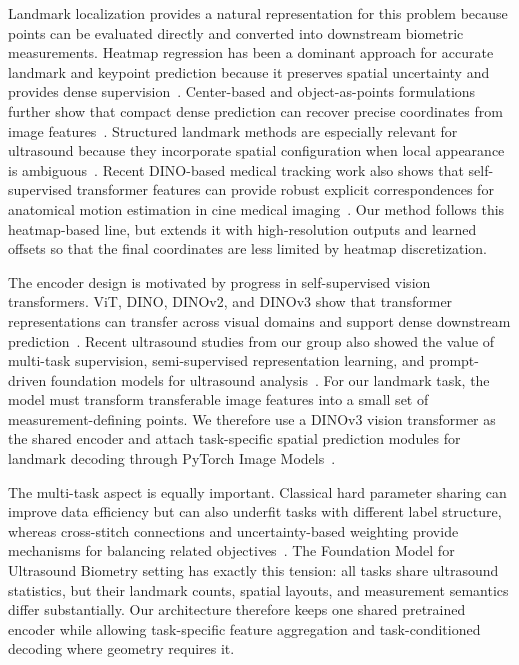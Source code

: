 \documentclass[runningheads]{llncs}
\begin{document}
Landmark localization provides a natural representation for this problem because points can be evaluated directly and converted into downstream biometric measurements. Heatmap regression has been a dominant approach for accurate landmark and keypoint prediction because it preserves spatial uncertainty and provides dense supervision~\cite{payer2016regressing,newell2016hourglass,sun2019hrnet}. Center-based and object-as-points formulations further show that compact dense prediction can recover precise coordinates from image features~\cite{zhou2019objects}. Structured landmark methods are especially relevant for ultrasound because they incorporate spatial configuration when local appearance is ambiguous~\cite{payer2019integrating}.
Recent DINO-based medical tracking work also shows that self-supervised transformer features can provide robust explicit correspondences for anatomical motion estimation in cine medical imaging~\cite{salari2025dinomotion}.
Our method follows this heatmap-based line, but extends it with high-resolution outputs and learned offsets so that the final coordinates are less limited by heatmap discretization.

The encoder design is motivated by progress in self-supervised vision transformers. ViT, DINO, DINOv2, and DINOv3 show that transformer representations can transfer across visual domains and support dense downstream prediction~\cite{dosovitskiy2021vit,caron2021dino,oquab2024dinov2,simeoni2025dinov3}. Recent ultrasound studies from our group also showed the value of multi-task supervision, semi-supervised representation learning, and prompt-driven foundation models for ultrasound analysis~\cite{behboodi2021breast,rasaee2025sarcopenia,rasaee2025grounding}. For our landmark task, the model must transform transferable image features into a small set of measurement-defining points. We therefore use a DINOv3 vision transformer as the shared encoder and attach task-specific spatial prediction modules for landmark decoding through PyTorch Image Models~\cite{timm}.

The multi-task aspect is equally important. Classical hard parameter sharing can improve data efficiency but can also underfit tasks with different label structure, whereas cross-stitch connections and uncertainty-based weighting provide mechanisms for balancing related objectives~\cite{caruana1997,misra2016crossstitch,kendall2018multitask}. The Foundation Model for Ultrasound Biometry setting has exactly this tension: all tasks share ultrasound statistics, but their landmark counts, spatial layouts, and measurement semantics differ substantially. Our architecture therefore keeps one shared pretrained encoder while allowing task-specific feature aggregation and task-conditioned decoding where geometry requires it.
\end{document}
